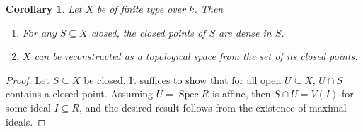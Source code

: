 \documentclass[leqno, openany]{memoir}
\newtheorem{cor}[thm]{Corollary}
\theoremstyle{definition}
\theoremstyle{remark}
\theoremstyle{plain}
\theoremstyle{definition}
\theoremstyle{remark}
\DeclareMathOperator{\Spec}{Spec}
\begin{document}
\begin{cor}
    Let $X$ be of finite type over $k$. Then
    \begin{enumerate}
        \item For any $S \subseteq X$ closed, the closed points of $S$ are dense in $S$.
        \item $X$ can be reconstructed as a topological space from the set of its closed points.
    \end{enumerate}
\end{cor}

\begin{proof}
    Let $S \subseteq X$ be closed. It suffices to show that for all open $U \subseteq X$, $U \cap S$ contains a closed point. Assuming $U = \Spec R$ is affine, then $S \cap U = V(I)$ for some ideal $I \subseteq R$, and the desired result follows from the existence of maximal ideals.
\end{proof}
\end{document}
